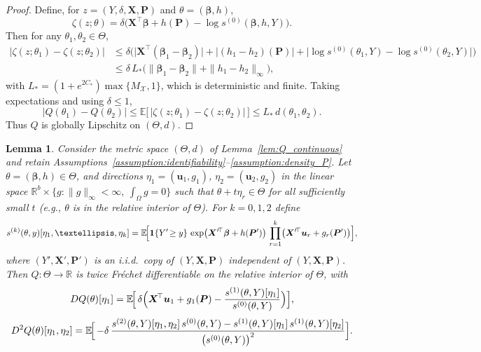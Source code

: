 \documentclass[11pt]{article}
\newcommand{\E}{\mathbb{E}}
\newtheorem{lemma}{Lemma}
\begin{document}
\begin{proof}
    Define, for $z=(Y,\delta,\bm X,\bm P)$ and $\theta=(\bm\beta,h)$,
    \[
    \zeta(z;\theta)=\delta\Big(\bm X^\top\bm\beta+h(\bm P)-\log s^{(0)}(\bm\beta,h,Y)\Big).
    \]
    Then for any $\theta_1,\theta_2\in\Theta$,
    \[
    \begin{aligned}
    \big|\zeta(z;\theta_1)-\zeta(z;\theta_2)\big|
    &\le \delta\Big(\big|\bm X^\top(\bm\beta_1-\bm\beta_2)\big|+\big|(h_1-h_2)(\bm P)\big|
    +\big|\log s^{(0)}(\theta_1,Y)-\log s^{(0)}(\theta_2,Y)\big|\Big)\\
    &\le \delta\,L_*\Big(\|\bm\beta_1-\bm\beta_2\|+\|h_1-h_2\|_\infty\Big),
    \end{aligned}
    \]
    with $L_*=(1+e^{2C_*})\max\{M_{\mathcal X},1\}$, which is deterministic and finite.
    Taking expectations and using $\delta\le 1$,
    \[
    |Q(\theta_1)-Q(\theta_2)|
    \le \mathbb E\big[\,|\zeta(z;\theta_1)-\zeta(z;\theta_2)|\,\big]
    \le L_*\,d(\theta_1,\theta_2).
    \]
    Thus $Q$ is globally Lipschitz on $(\Theta,d)$.
    \end{proof}
	

    \begin{lemma}\label{lem:Q_C2}
    Consider the metric space $(\Theta,d)$ of Lemma~\ref{lem:Q_continuous} and
    retain Assumptions~\ref{assumption:identifiability}--\ref{assumption:density_P}.
    Let $\theta=(\bm\beta,h)\in\Theta$, and directions
    $\eta_1=(\bm u_1,g_1)$, $\eta_2=(\bm u_2,g_2)$ in the linear space
    $\mathbb R^b\times\{g:\|g\|_\infty<\infty,\ \int_\Omega g=0\}$ such that
    $\theta+t\eta_r\in\Theta$ for all sufficiently small $t$ (e.g., $\theta$ is in the
    relative interior of $\Theta$).
    For $k=0,1,2$ define
    \[
    s^{(k)}(\theta,y)[\eta_1,\ldots,\eta_k]
    =\E\!\Bigl[
    \mathbf 1\{Y'\!\ge y\}\,
    \exp\bigl(\bm X'^{\!\top}\bm\beta+h(\bm P')\bigr)\,
    \prod_{r=1}^k\bigl(\bm X'^{\!\top}\bm u_r+g_r(\bm P')\bigr)
    \Bigr],
    \]
    where $(Y',\bm X',\bm P')$ is an i.i.d.\ copy of $(Y,\bm X,\bm P)$ independent of
    $(Y,\bm X,\bm P)$.
    Then $Q:\Theta\to\mathbb R$ is twice Fr\'echet differentiable on the relative
    interior of $\Theta$, with
    \[
    DQ(\theta)[\eta_1]
    =\E\!\Bigl[\,
    \delta\Bigl(
    \bm X^{\!\top}\bm u_1+g_1(\bm P)
    -\frac{s^{(1)}(\theta,Y)[\eta_1]}{s^{(0)}(\theta,Y)}
    \Bigr)
    \Bigr],
    \]
    \[
    D^2Q(\theta)[\eta_1,\eta_2]
    =\E\!\Bigl[\,
    -\delta\,
    \frac{
    s^{(2)}(\theta,Y)[\eta_1,\eta_2]\,
    s^{(0)}(\theta,Y)
    -s^{(1)}(\theta,Y)[\eta_1]\,
    s^{(1)}(\theta,Y)[\eta_2]
    }{
    \bigl(s^{(0)}(\theta,Y)\bigr)^2
    }
    \Bigr].
    \]
    \end{lemma}
    
\end{document}
